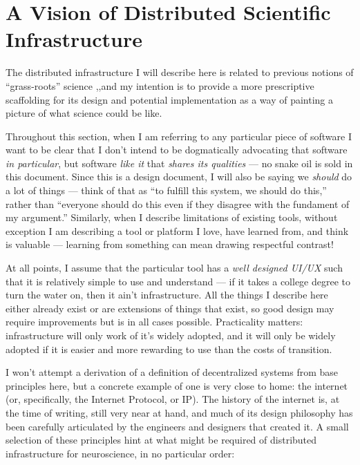 \documentclass{article}
\begin{document}
\hypertarget{a-vision-of-distributed-scientific-infrastructure}{%
\section{A Vision of Distributed Scientific
Infrastructure}\label{a-vision-of-distributed-scientific-infrastructure}}

The distributed infrastructure I will describe here is related to
previous notions of ``grass-roots'' science \cite{mainenBetterWayCrack2016},,and my intention is to provide a more
prescriptive scaffolding for its design and potential implementation as
a way of painting a picture of what science could be like.

Throughout this section, when I am referring to any particular piece of
software I want to be clear that I don't intend to be dogmatically
advocating that software \emph{in particular}, but software \emph{like
it} that \emph{shares its qualities} --- no snake oil is sold in this
document. Since this is a design document, I will also be saying we
\emph{should} do a lot of things --- think of that as ``to fulfill this
system, we should do this,'' rather than ``everyone should do this even
if they disagree with the fundament of my argument.'' Similarly, when I
describe limitations of existing tools, without exception I am
describing a tool or platform I love, have learned from, and think is
valuable --- learning from something can mean drawing respectful
contrast!

At all points, I assume that the particular tool has a \emph{well
designed UI/UX} such that it is relatively simple to use and understand
--- if it takes a college degree to turn the water on, then it ain't
infrastructure. All the things I describe here either already exist or
are extensions of things that exist, so good design may require
improvements but is in all cases possible. Practicality matters:
infrastructure will only work of it's widely adopted, and it will only
be widely adopted if it is easier and more rewarding to use than the
costs of transition.

I won't attempt a derivation of a definition of decentralized systems
from base principles here, but a concrete example of one is very close
to home: the internet (or, specifically, the Internet Protocol, or IP).
The history of the internet is, at the time of writing, still very near
at hand, and much of its design philosophy has been carefully
articulated by the engineers and designers that created it. A small
selection of these principles hint at what might be required of
distributed infrastructure for neuroscience, in no particular order:
\end{document}
